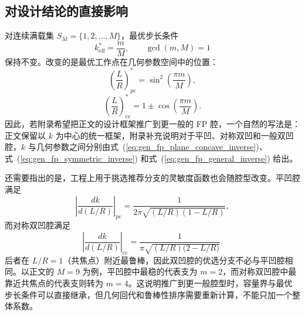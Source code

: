 \subsection{对设计结论的直接影响}

对连续满载集 $S_M=\{1,2,\dots,M\}$，最优步长条件
\begin{equation}
k_{\mathrm{eff}}^*=\frac{m}{M},
\qquad
\gcd(m,M)=1
\label{eq:gen_fp_kstar}
\end{equation}
保持不变。改变的是最优工作点在几何参数空间中的位置：
\begin{equation}
\left(\frac{L}{R}\right)^*_{\mathrm{pc}}
=
\sin^2\!\left(\frac{\pi m}{M}\right),
\label{eq:gen_fp_plane_branch}
\end{equation}
\begin{equation}
\left(\frac{L}{R}\right)^*_{\mathrm{cc}}
=
1\pm \cos\!\left(\frac{\pi m}{M}\right).
\label{eq:gen_fp_cc_branch}
\end{equation}
因此，若附录希望把正文的设计框架推广到更一般的 FP 腔，一个自然的写法是：正文保留以 $k$ 为中心的统一框架，附录补充说明对于平凹、对称双凹和一般双凹腔，$k$ 与几何参数之间分别由式~(\ref{eq:gen_fp_plane_concave_inverse})、式~(\ref{eq:gen_fp_symmetric_inverse}) 和式~(\ref{eq:gen_fp_general_inverse}) 给出。

还需要指出的是，工程上用于挑选推荐分支的灵敏度函数也会随腔型改变。平凹腔满足
\begin{equation}
\left|\frac{dk}{d(L/R)}\right|_{\mathrm{pc}}
=
\frac{1}{2\pi\sqrt{(L/R)(1-L/R)}},
\label{eq:gen_fp_pc_sensitivity}
\end{equation}
而对称双凹腔满足
\begin{equation}
\left|\frac{dk}{d(L/R)}\right|_{\mathrm{cc}}
=
\frac{1}{\pi\sqrt{(L/R)\bigl(2-L/R\bigr)}}.
\label{eq:gen_fp_cc_sensitivity}
\end{equation}
后者在 $L/R=1$（共焦点）附近最鲁棒，因此双凹腔的优选分支不必与平凹腔相同。以正文的 $M=9$ 为例，平凹腔中最稳的代表支为 $m=2$，而对称双凹腔中最靠近共焦点的代表支则转为 $m=4$。这说明推广到更一般腔型时，容量界与最优步长条件可以直接继承，但几何回代和鲁棒性排序需要重新计算，不能只加一个整体系数。
